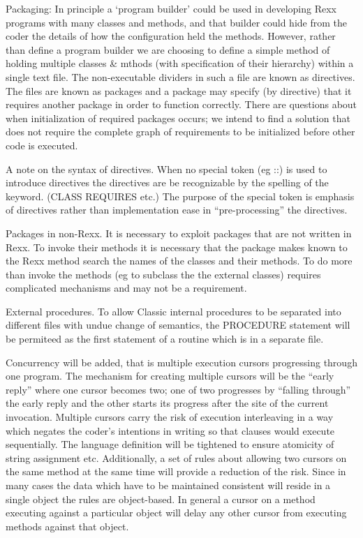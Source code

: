 Packaging: In principle a `program builder' could be used in developing
Rexx programs with many classes and methods, and that builder could hide
from the coder the details of how the configuration held the methods.
However, rather than define a program builder we are choosing to define
a simple method of holding multiple classes \& mthods (with
specification of their hierarchy) within a single text file. The
non-executable dividers in such a file are known as directives. The
files are known as packages and a package may specify (by directive)
that it requires another package in order to function correctly. There
are questions about when initialization of required packages occurs; we
intend to find a solution that does not require the complete graph of
requirements to be initialized before other code is executed.

A note on the syntax of directives. When no special token (eg ::) is
used to introduce directives the directives are be recognizable by the
spelling of the keyword. (CLASS REQUIRES etc.) The purpose of the
special token is emphasis of directives rather than implementation ease
in ``pre-processing'' the directives.

Packages in non-Rexx. It is necessary to exploit packages that are not
written in Rexx. To invoke their methods it is necessary that the
package makes known to the Rexx method search the names of the classes
and their methods. To do more than invoke the methods (eg to subclass
the the external classes) requires complicated mechanisms and may not be
a requirement.

External procedures. To allow Classic internal procedures to be
separated into different files with undue change of semantics, the
PROCEDURE statement will be permiteed as the first statement of a
routine which is in a separate file.

Concurrency will be added, that is multiple execution cursors
progressing through one program. The mechanism for creating multiple
cursors will be the ``early reply'' where one cursor becomes two; one of
two progresses by ``falling through'' the early reply and the other
starts its progress after the site of the current invocation. Multiple
cursors carry the risk of execution interleaving in a way which negates
the coder's intentions in writing so that clauses would execute
sequentially. The language definition will be tightened to ensure
atomicity of string assignment etc. Additionally, a set of rules about
allowing two cursors on the same method at the same time will provide a
reduction of the risk. Since in many cases the data which have to be
maintained consistent will reside in a single object the rules are
object-based. In general a cursor on a method executing against a
particular object will delay any other cursor from executing methods
against that object.

